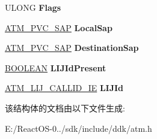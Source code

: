 \begin{DoxyCompactItemize}
U\+L\+O\+NG {\bfseries Flags}
\item 
\mbox{\label{struct___q2931___a_d_d___p_v_c_a36eaafabdaeb8bd84546fcd9978059a4}} 
\hyperlink{struct___a_t_m___p_v_c___s_a_p}{A\+T\+M\+\_\+\+P\+V\+C\+\_\+\+S\+AP} {\bfseries Local\+Sap}
\item 
\mbox{\label{struct___q2931___a_d_d___p_v_c_a32d8c61de8b6d5afb48007e06e15d748}} 
\hyperlink{struct___a_t_m___p_v_c___s_a_p}{A\+T\+M\+\_\+\+P\+V\+C\+\_\+\+S\+AP} {\bfseries Destination\+Sap}
\item 
\mbox{\label{struct___q2931___a_d_d___p_v_c_a432511b1f71a989aa0f90f9c32b014c7}} 
\hyperlink{_processor_bind_8h_a112e3146cb38b6ee95e64d85842e380a}{B\+O\+O\+L\+E\+AN} {\bfseries L\+I\+J\+Id\+Present}
\item 
\mbox{\label{struct___q2931___a_d_d___p_v_c_a24f295214c0a26a39ace568d6839cee1}} 
\hyperlink{struct___a_t_m___l_i_j___c_a_l_l_i_d___i_e}{A\+T\+M\+\_\+\+L\+I\+J\+\_\+\+C\+A\+L\+L\+I\+D\+\_\+\+IE} {\bfseries L\+I\+J\+Id}
\end{DoxyCompactItemize}


该结构体的文档由以下文件生成\+:\begin{DoxyCompactItemize}
\item 
E\+:/\+React\+O\+S-\/0../sdk/include/ddk/atm.\+h\end{DoxyCompactItemize}
